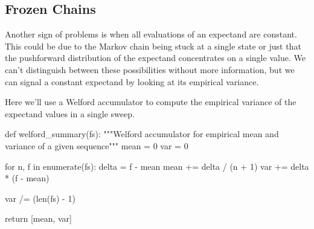 \documentclass[
  letterpaper,
  DIV=11,
  numbers=noendperiod]{scrartcl}
\newenvironment{Shaded}{\begin{snugshade}}{\end{snugshade}}
\newcommand{\BuiltInTok}[1]{\textcolor[rgb]{0.00,0.23,0.31}{#1}}
\newcommand{\CommentTok}[1]{\textcolor[rgb]{0.37,0.37,0.37}{#1}}
\newcommand{\ControlFlowTok}[1]{\textcolor[rgb]{0.00,0.23,0.31}{#1}}
\newcommand{\DecValTok}[1]{\textcolor[rgb]{0.68,0.00,0.00}{#1}}
\newcommand{\KeywordTok}[1]{\textcolor[rgb]{0.00,0.23,0.31}{#1}}
\newcommand{\NormalTok}[1]{\textcolor[rgb]{0.00,0.23,0.31}{#1}}
\newcommand{\OperatorTok}[1]{\textcolor[rgb]{0.37,0.37,0.37}{#1}}
\begin{document}
\hypertarget{frozen-chains}{%
\subsection{Frozen Chains}\label{frozen-chains}}

Another sign of problems is when all evaluations of an expectand are
constant. This could be due to the Markov chain being stuck at a single
state or just that the pushforward distribution of the expectand
concentrates on a single value. We can't distinguish between these
possibilities without more information, but we can signal a constant
expectand by looking at its empirical variance.

Here we'll use a Welford accumulator to compute the empirical variance
of the expectand values in a single sweep.

\begin{Shaded}
\begin{Highlighting}[]
\KeywordTok{def}\NormalTok{ welford\_summary(fs):}
  \CommentTok{"""Welford accumulator for empirical mean and variance of a given sequence"""}
\NormalTok{  mean }\OperatorTok{=} \DecValTok{0}
\NormalTok{  var }\OperatorTok{=} \DecValTok{0}
  
  \ControlFlowTok{for}\NormalTok{ n, f }\KeywordTok{in} \BuiltInTok{enumerate}\NormalTok{(fs):}
\NormalTok{    delta }\OperatorTok{=}\NormalTok{ f }\OperatorTok{{-}}\NormalTok{ mean}
\NormalTok{    mean }\OperatorTok{+=}\NormalTok{ delta }\OperatorTok{/}\NormalTok{ (n }\OperatorTok{+} \DecValTok{1}\NormalTok{)}
\NormalTok{    var }\OperatorTok{+=}\NormalTok{ delta }\OperatorTok{*}\NormalTok{ (f }\OperatorTok{{-}}\NormalTok{ mean)}
    
\NormalTok{  var }\OperatorTok{/=}\NormalTok{ (}\BuiltInTok{len}\NormalTok{(fs) }\OperatorTok{{-}} \DecValTok{1}\NormalTok{)}
  
  \ControlFlowTok{return}\NormalTok{ [mean, var]}
\end{Highlighting}
\end{Shaded}
\end{document}
